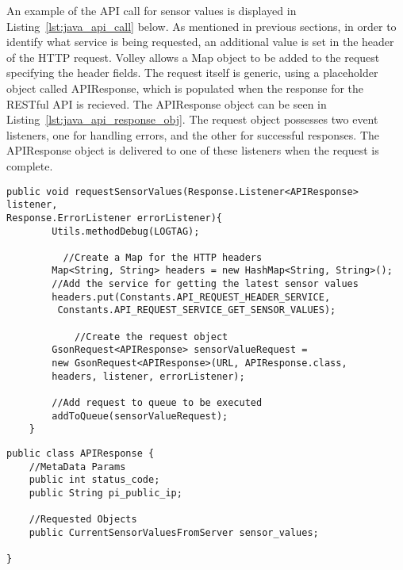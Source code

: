 \documentclass{article}
\begin{document}
\noindent
An example of the API call for sensor values is displayed in Listing~\ref{lst:java_api_call} below.
As mentioned in previous sections, in order to identify what service is being requested, an additional value is set in the header of the HTTP request. Volley allows a Map object to be added to the request specifying the header fields. The request itself is generic, using a placeholder object called APIResponse, which is populated when the response for the RESTful API is recieved. The APIResponse object can be seen in Listing~\ref{lst:java_api_response_obj}. The request object possesses two event listeners, one for handling errors, and the other for successful responses. The APIResponse object is delivered to one of these listeners when the request is complete. 

\begin{lstlisting}[caption={Java method API call for request latest sensor readings},label={lst:java_api_call}]
public void requestSensorValues(Response.Listener<APIResponse> listener,
Response.ErrorListener errorListener){
        Utils.methodDebug(LOGTAG);

	      //Create a Map for the HTTP headers
        Map<String, String> headers = new HashMap<String, String>();
        //Add the service for getting the latest sensor values
        headers.put(Constants.API_REQUEST_HEADER_SERVICE,
         Constants.API_REQUEST_SERVICE_GET_SENSOR_VALUES);

		    //Create the request object
        GsonRequest<APIResponse> sensorValueRequest = 
        new GsonRequest<APIResponse>(URL, APIResponse.class, 
        headers, listener, errorListener);
        
        //Add request to queue to be executed
        addToQueue(sensorValueRequest);
    }

\end{lstlisting}

\begin{lstlisting}[caption={APIResponse class, used when parsing the RESTful API response},label={lst:java_api_response_obj}]
public class APIResponse {
    //MetaData Params
    public int status_code;
    public String pi_public_ip;

    //Requested Objects
    public CurrentSensorValuesFromServer sensor_values;

}
\end{lstlisting}	
\end{document}
